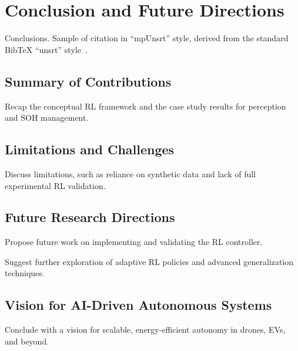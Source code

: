 \chapter{Conclusion and Future Directions}\label{ch:6}
\minitoc

Conclusions. Sample of citation \cite{DBLP:journals/sigcas/X91} in ``mpUnsrt'' style, derived from the standard {Bib\TeX} ``unsrt'' style~\cite{Lamport1994-Latex}.

\newpage

\section{Summary of Contributions}

Recap the conceptual RL framework and the case study results for perception and SOH management.


\section{Limitations and Challenges}

Discuss limitations, such as reliance on synthetic data and lack of full experimental RL validation.


\section{Future Research Directions}

Propose future work on implementing and validating the RL controller.

Suggest further exploration of adaptive RL policies and advanced generalization techniques.


\section{Vision for AI-Driven Autonomous Systems}

Conclude with a vision for scalable, energy-efficient autonomy in drones, EVs, and beyond.

\endinput